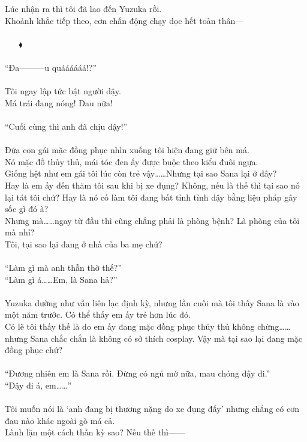 \documentclass[12pt,a4paper, twosides]{book}
\begin{document}
Lúc nhận ra thì tôi đã lao đến Yuzuka rồi.\\
Khoảnh khắc tiếp theo, cơn chấn động chạy dọc hết toàn thân—\\
\\
     $\mathbin{\blacklozenge}$\\
\\
“Đa———u quáááááá!?”\\
\\
Tôi ngay lập tức bật người dậy.\\
Má trái đang nóng! Đau nữa!\\
\\
“Cuối cùng thì anh đã chịu dậy!”\\
\\
Đứa con gái mặc đồng phục nhìn xuống tôi hiện đang giữ bên má.\\
Nó mặc đồ thủy thủ, mái tóc đen ấy được buộc theo kiểu đuôi ngựa.\\
Giống hệt như em gái tôi lúc còn trẻ vậy……Nhưng tại sao Sana lại ở đây?\\
Hay là em ấy đến thăm tôi sau khi bị xe đụng? Không, nếu là thế thì tại sao nó lại tát tôi chứ? Hay là nó cố làm tôi đang bất tỉnh tỉnh dậy bằng liệu pháp gây sốc gì đó à?\\
Nhưng mà……ngay từ đầu thì cũng chẳng phải là phòng bệnh? Là phòng của tôi mà nhỉ?\\
Tôi, tại sao lại đang ở nhà của ba mẹ chứ?\\
\\
“Làm gì mà anh thẫn thờ thế?”\\
“Làm gì á……Em, là Sana hả?”\\
\\
Yuzuka dường như vẫn liên lạc định kỳ, nhưng lần cuối mà tôi thấy Sana là vào một năm trước. Có thể thấy em ấy trẻ hơn lúc đó.\\
Có lẽ tôi thấy thế là do em ấy đang mặc đồng phục thủy thủ không chừng……nhưng Sana chắc chắn là không có sở thích cosplay. Vậy mà tại sao lại đang mặc đồng phục chứ?\\
\\
“Đương nhiên em là Sana rồi. Đừng có ngủ mớ nữa, mau chóng dậy đi.”\\
“Dậy đi á, em……”\\
\\
Tôi muốn nói là ‘anh đang bị thương nặng do xe đụng đấy’ nhưng chẳng có cơn đau nào khác ngoài gò má cả.\\
Lành lặn một cách thần kỳ sao? Nếu thế thì——\\
\end{document}

